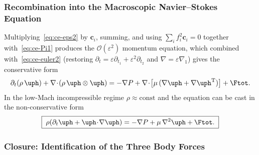 \subsubsection{Recombination into the Macroscopic Navier--Stokes Equation}\label{sec:ce-recomb}

Multiplying~\eqref{eq:ce-eps2} by $\bm{c}_i$, summing, and using $\sum_i f_i^{2}\bm{c}_i = 0$ together with~\eqref{eq:ce-Pi1} produces the $\mathcal{O}(\varepsilon^{2})$ momentum equation, which combined with~\eqref{eq:ce-euler2} (restoring $\partial_t = \varepsilon\partial_{t_1} + \varepsilon^{2}\partial_{t_2}$ and $\nabla = \varepsilon\nabla_1$) gives the conservative form
\begin{equation}
\partial_t(\rho\,\uph) + \nabla\!\cdot\!(\rho\,\uph\otimes\uph) = -\nabla P + \nabla\!\cdot\!\bigl[\mu\,(\nabla\uph + \nabla\uph^{\mathrm{T}})\bigr] + \Ftot.
\label{eq:ce-NS-cons}
\end{equation}
In the low-Mach incompressible regime $\rho \approx \mathrm{const}$ and the equation can be cast in the non-conservative form
\begin{equation}
\boxed{\;\rho\!\left(\partial_t\uph + \uph\!\cdot\!\nabla\uph\right) = -\nabla P + \mu\,\nabla^{2}\uph + \Ftot.\;}
\label{eq:ce-NS-body}
\end{equation}

\subsubsection{Closure: Identification of the Three Body Forces}\label{sec:ce-closure}

